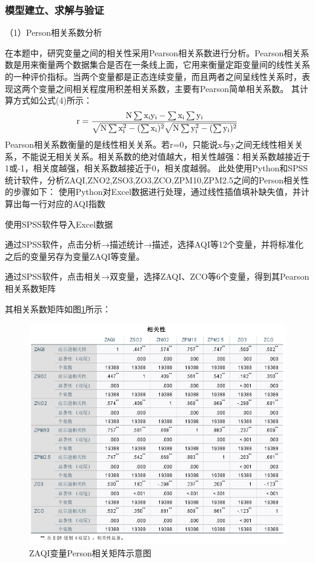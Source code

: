 \documentclass[bwprint]{gmcmthesis}
\numberwithin{figure}{section}
\begin{document}
\subsubsection{模型建立、求解与验证}
（1）Person相关系数分析

在本题中，研究变量之间的相关性采用Pearson相关系数进行分析。Pearson相关系数是用来衡量两个数据集合是否在一条线上面，它用来衡量定距变量间的线性关系的一种评价指标。当两个变量都是正态连续变量，而且两者之间呈线性关系时，表现这两个变量之间相关程度用积差相关系数，主要有Pearson简单相关系数。
其计算方式如公式(4)所示：
\begin{equation}
	\rm r = \frac{N\sum{x_iy_i}-\sum{x_i}\sum{y_i}}{\sqrt{N\sum{x_i^2}-(\sum{x_i})^2}\sqrt{N\sum{y_i^2}-(\sum{y_i})^2}}
\end{equation}
Pearson相关系数衡量的是线性相关关系。若r=0，只能说x与y之间无线性相关关系，不能说无相关关系。相关系数的绝对值越大，相关性越强：相关系数越接近于1或-1，相关度越强，相关系数越接近于0，相关度越弱。
此处使用Python和SPSS统计软件，分析ZAQI,ZNO2,ZSO3,ZO3,ZCO,ZPM10,ZPM2.5之间的Person相关性的步骤如下：
 使用Python对Excel数据进行处理，通过线性插值填补缺失值，并计算出每一行对应的AQI指数

 使用SPSS软件导入Excel数据

 通过SPSS软件，点击分析→描述统计→描述，选择AQI等12个变量，并将标准化之后的变量另存为变量ZAQI等变量。

 通过SPSS软件，点击相关→双变量，选择ZAQI、ZCO等6个变量，得到其Pearson相关系数矩阵

其相关系数矩阵如图\ref{fig3-3}所示：
\begin{figure}[!h]
	\centering
	\includegraphics[width=.7\textwidth]{figures//fig3-3.png}
	\caption{ZAQI变量Person相关矩阵示意图}
	\label{fig3-3}
\end{figure}
\end{document}
